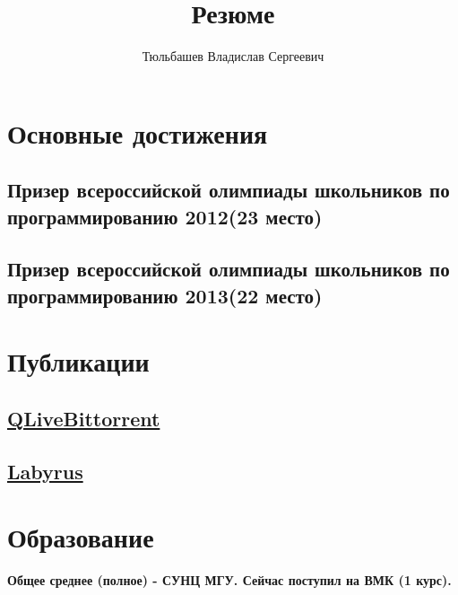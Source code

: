 \documentclass[a4paper,10pt]{article}
\title{\huge Резюме}
\author{\Huge Тюльбашев Владислав Сергеевич}
\begin{document}
\maketitle
\section{Основные достижения} {
    \subsection{Призер всероссийской олимпиады школьников по программированию 2012(23 место)}{}
    \subsection{Призер всероссийской олимпиады школьников по программированию 2013(22 место)}{}
}
\section{Публикации} {
    \subsection{\href{http://habrahabr.ru/post/185770/}{QLiveBittorrent}}{}
    \subsection{\href{http://habrahabr.ru/post/177807/}{Labyrus}}{}
}
\section{Образование} {
    \bfseries
    Общее среднее (полное) - СУНЦ МГУ.
    Сейчас поступил на ВМК (1 курс).
}
\end{document}
